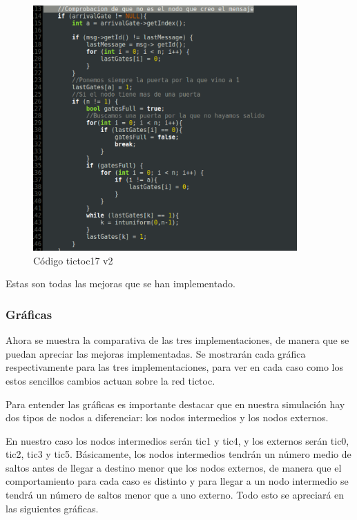 \documentclass{article}
\begin{document}
		\begin{figure}[htb]
		\centering
		\includegraphics[width=0.9\textwidth]{figura3.png}
		\caption{Código tictoc17 v2}
		\end {figure}
		\newpage
		
		Estas son todas las mejoras que se han implementado. \\
		
		\subsubsection{Gráficas}
		
		Ahora se muestra la comparativa de las tres implementaciones, de manera que se puedan apreciar las mejoras implementadas. Se mostrarán cada gráfica respectivamente para las tres implementaciones, para ver en cada caso como los estos sencillos cambios actuan sobre la red tictoc.
		
		Para entender las gráficas es importante destacar que en nuestra simulación hay dos tipos de nodos a diferenciar: los nodos intermedios y los nodos externos.
		
		En nuestro caso los nodos intermedios serán tic1 y tic4, y los externos serán tic0, tic2, tic3 y tic5. Básicamente, los nodos intermedios tendrán un número medio de saltos antes de llegar a destino menor que los nodos externos, de manera que el comportamiento para cada caso es distinto y para llegar a un nodo intermedio se tendrá un número de saltos menor que a uno externo. Todo esto se apreciará en las siguientes gráficas.\\
	
\end{document}
